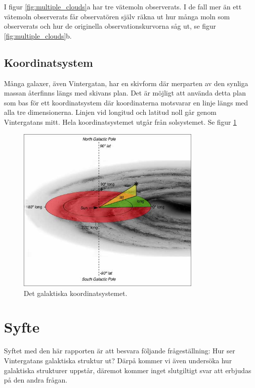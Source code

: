 I figur \ref{fig:multiple_clouds}a har tre vätemoln observerats. I de fall mer än ett vätemoln observerats får observatören själv räkna ut hur många moln som observerats och hur de originella observationskurvorna såg ut, se figur \ref{fig:multiple_clouds}b.

\subsection{Koordinatsystem}
Många galaxer, även Vintergatan, har en skivform där merparten av den synliga massan återfinns längs med skivans plan. Det är möjligt att använda detta plan som bas för ett koordinatsystem där koordinaterna motsvarar en linje längs med alla tre dimensionerna\autocite{swin:galactic_coords}. Linjen vid longitud och latitud noll går genom Vintergatans mitt. Hela koordinatsystemet utgår från solsystemet. Se figur \ref{fig:galactic_coords}

\begin{figure}
    \centering
    \includegraphics[width=0.8\textwidth]{pics/galactic_coords.jpg}
    \caption{Det galaktiska koordinatsystemet.}
    \label{fig:galactic_coords}
\end{figure}

\section{Syfte}
Syftet med den här rapporten är att besvara följande frågeställning: Hur ser Vintergatans galaktiska struktur ut? Därpå kommer vi även undersöka hur galaktiska strukturer uppstår, däremot kommer inget slutgiltigt svar att erbjudas på den andra frågan.
